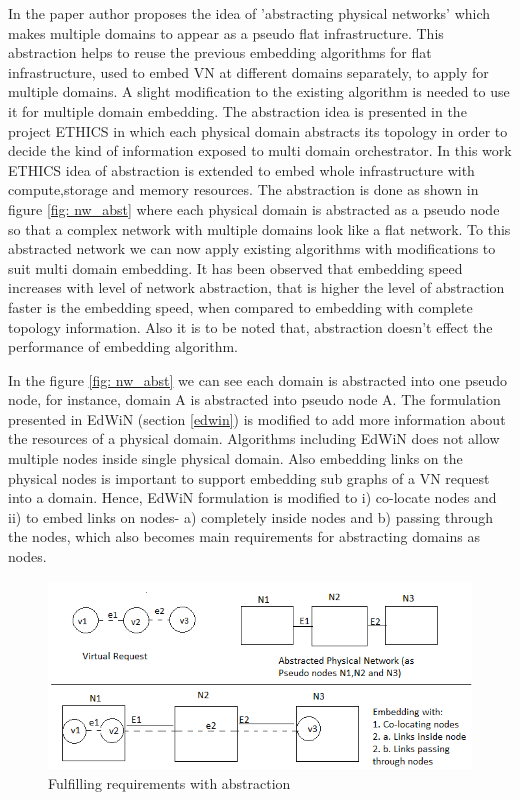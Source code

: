 \documentclass[article,dr=phil,type=msc ,colorback,accentcolor=tud4b]{tudthesis}
\begin{document}
In the paper \cite{multi-domain} author proposes the idea of 'abstracting physical networks' which makes multiple domains to appear as a pseudo flat infrastructure. This abstraction helps to reuse the previous embedding algorithms for flat infrastructure, used to embed VN at different domains separately, to apply for multiple domains. A slight modification to the existing algorithm is needed to use it for multiple domain embedding. The abstraction idea is presented in the project ETHICS \cite{EHTICS} in which each physical domain abstracts its topology in order to decide the kind of information exposed to multi domain orchestrator. In this work \cite{multi-domain} ETHICS idea of abstraction is extended to embed whole infrastructure with compute,storage and memory resources. The abstraction is done as shown in figure \ref{fig: nw_abst} where each physical domain is abstracted as a pseudo node so that a complex network with multiple domains look like a flat network. To this abstracted network we can now apply existing algorithms with modifications to suit multi domain embedding. It has been observed that embedding speed increases with level of network abstraction, that is higher the level of abstraction faster is the embedding speed, when compared to embedding with complete topology information. Also it is to be noted that, abstraction doesn't effect the performance of embedding algorithm.

In the figure \ref{fig: nw_abst} we can see each domain is abstracted into one pseudo node, for instance, domain A is abstracted into pseudo node A. The formulation presented in EdWiN (section \ref{edwin}) is modified to add more information about the resources of a physical domain. Algorithms including EdWiN does not allow multiple nodes inside single physical domain. Also embedding links on the physical nodes is important to support embedding sub graphs of a VN request into a domain. Hence, EdWiN formulation is modified to i) co-locate nodes and ii) to embed links on nodes- a) completely inside nodes and b) passing through the nodes, which also becomes main requirements for abstracting domains as nodes.\newline

\begin{figure}[h]
	\centering
	\includegraphics[width=14cm, height=5cm]{modify}
	\caption{Fulfilling requirements with abstraction}
	\label{fig: modify}
\end{figure}
\end{document}
